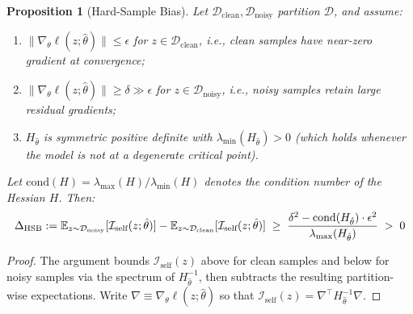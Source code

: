\documentclass[12pt, a4paper, twoside]{book}
\numberwithin{equation}{chapter}
\theoremstyle{plain}
\newtheorem{proposition}[theorem]{Proposition}
\theoremstyle{definition}
\theoremstyle{remark}
\newenvironment{foldable}{}{}
\begin{document}
\begin{foldable} \begin{proposition}[Hard-Sample Bias] \label{prop:hsb}
        Let $\mathcal{D}_\text{clean}, \mathcal{D}_\text{noisy}$ partition $\mathcal{D}$, and assume:
        \begin{enumerate}[label=\textbf{(A\arabic*)},leftmargin=*]
            \item $\|\nabla_\theta \ell(z; \hat{\theta})\| \leq \epsilon$ for $z \in \mathcal{D}_\text{clean}$, i.e., clean samples have near-zero gradient at convergence;
            \item $\|\nabla_\theta \ell(z; \hat{\theta})\| \geq \delta \gg \epsilon$ for $z \in \mathcal{D}_\text{noisy}$, i.e., noisy samples retain large residual gradients;
            \item $H_{\hat\theta}$ is symmetric positive definite with $\lambda_{\min}(H_{\hat\theta}) > 0$ (which holds whenever the model is not at a degenerate critical point).
        \end{enumerate}
        Let $\text{cond}(H) = \lambda_{\max}(H) / \lambda_{\min}(H)$ denotes the condition number of the Hessian $H$.
        Then:
        \begin{equation}
            \Delta_\textup{HSB} := \mathbb{E}_{z \sim \mathcal{D}_\textup{noisy}}[\mathcal{I}_\textup{self}(z;\hat{\theta})]
            - \mathbb{E}_{z \sim \mathcal{D}_\textup{clean}}[\mathcal{I}_\textup{self}(z;\hat{\theta})]
            \;\geq\; \frac{\delta^2 - \text{cond}(H_{\hat{\theta}}) \cdot \epsilon^2}{\lambda_{\max}(H_{\hat{\theta}})}
            \;>\; 0
            \label{eq:hsb}
        \end{equation}
    \end{proposition}
    \begin{proof}
        The argument bounds $\mathcal{I}_\text{self}(z)$ above for clean samples and below for noisy samples via the spectrum of $H_{\hat\theta}^{-1}$, then subtracts the resulting partition-wise expectations.
        Write $\nabla \equiv \nabla_\theta \ell(z;\hat\theta)$ so that $\mathcal{I}_\text{self}(z) = \nabla^\top H_{\hat\theta}^{-1} \nabla$.


\end{proof}
\end{foldable}
\end{document}
